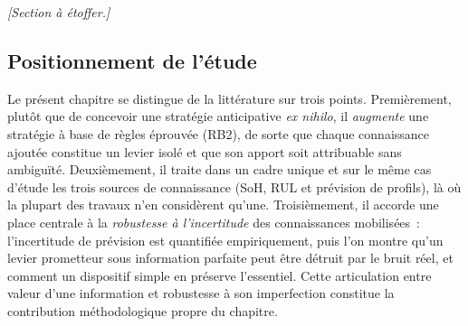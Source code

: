 
\medskip
\noindent\textit{[Section à étoffer.]}

\subsection{Positionnement de l'étude}
\label{subsec:positionnement_ch4}

Le présent chapitre se distingue de la littérature sur trois points. Premièrement, plutôt que de concevoir une stratégie anticipative \textit{ex nihilo}, il \emph{augmente} une stratégie à base de règles éprouvée (RB2), de sorte que chaque connaissance ajoutée constitue un levier isolé et que son apport soit attribuable sans ambiguïté. Deuxièmement, il traite dans un cadre unique et sur le même cas d'étude les trois sources de connaissance (SoH, RUL et prévision de profils), là où la plupart des travaux n'en considèrent qu'une. Troisièmement, il accorde une place centrale à la \emph{robustesse à l'incertitude} des connaissances mobilisées~: l'incertitude de prévision est quantifiée empiriquement, puis l'on montre qu'un levier prometteur sous information parfaite peut être détruit par le bruit réel, et comment un dispositif simple en préserve l'essentiel. Cette articulation entre valeur d'une information et robustesse à son imperfection constitue la contribution méthodologique propre du chapitre.
